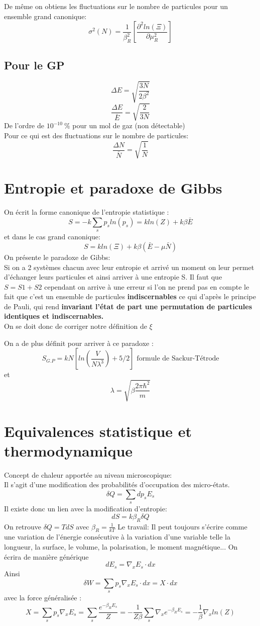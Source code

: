 De même on obtiens les fluctuations sur le nombre de particules pour un ensemble grand canonique:
$$ \sigma^2(N)= \frac{1}{\beta_R^2} \left[ \frac{\partial^2 ln(\Xi)}{\partial \mu_R^2}\right]$$

\subsection{Pour le GP}

$$\Delta E= \sqrt{\frac{3N}{2 \beta ^2}}$$
$$\frac{\Delta E}{\bar{E}}= \sqrt{\frac{2}{3N}}$$
De l'ordre de $10^{-10} \ \%$ pour un mol de gaz (non détectable)\\
Pour ce qui est des fluctuations sur le nombre de particules:
 $$\frac{\Delta N}{\bar{N}}= \sqrt{\frac{1}{N}}$$


\section{Entropie et paradoxe de Gibbs}


On écrit la forme canonique de l'entropie statistique :
$$S=-k\sum_s p_s ln(p_s) = kln(Z) + k\beta \bar{E}$$
et dans le cas grand canonique: 
$$S= kln(\Xi) + k\beta( \bar{E} -\mu \bar{N})$$
On présente le paradoxe de Gibbs:\\
Si on a 2 systèmes chacun avec leur entropie et arrivé un moment on leur permet d'échanger leurs particules et ainsi arriver à une entropie S. Il faut que \textbf{$S=S1+S2$} cependant on arrive à une erreur si l'on ne prend pas en compte le fait que c'est un ensemble de particules \textbf{indiscernables} ce qui d'après le principe de Pauli, qui rend \textbf{invariant l'état de part une permutation de particules identiques et indiscernables.}\\
On se doit donc de corriger notre définition de $\xi$
\begin{center}
\end{center}
On a de plus définit pour arriver à ce paradoxe :
$$S_{G.P}= kN\left[ln(\frac{V}{N\lambda^3})+5/2\right] \text{  formule de Sackur-Tétrode} $$
et 
$$\lambda= \sqrt{\beta\frac{2\pi \hbar^2}{m}}$$


\section{Equivalences statistique et thermodynamique}


Concept de chaleur apportée au niveau microscopique:\\
Il s'agit d'une modification des probabilités d'occupation des micro-états.
$$\delta Q= \sum_s dp_s E_s $$
Il existe donc un lien avec la modification d'entropie:
$$dS= k\beta_R \delta Q $$
On retrouve $ \delta Q = TdS $ avec $\beta_R=\frac{1}{kT}$
Le travail: 
Il peut toujours s'écrire comme une variation de l'énergie consécutive à la variation d'une variable telle la longueur, la surface, le volume, la polarisation, le moment magnétique... 
On écrira de manière générique 
$$dE_s = \nabla_xE_s \cdot dx $$
Ainsi 
$$\delta W= \sum_s p_s \nabla_xE_s \cdot dx = X \cdot dx $$
avec la force généralisée :
$$X = \sum_s p_s \nabla_xE_s = \sum_s \frac{e^{-\beta_R E_s}}{Z}=
-\frac{1}{Z\beta}\sum_s \nabla_x e^{-\beta_R E_s}= -\frac{1}{\beta}\nabla_x ln(Z)$$

